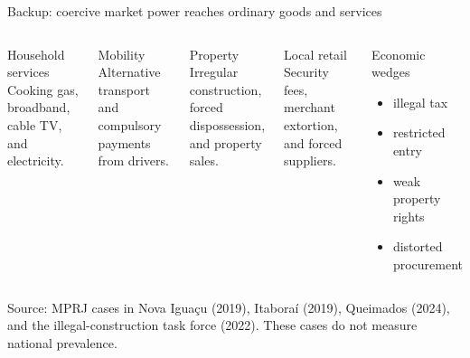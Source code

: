 \documentclass[10pt,aspectratio=169]{beamer}
\newcommand{\source}[1]{%
  \par\vfill{\tiny\color{MidGray}Source: #1}}
\begin{document}
\begin{frame}{Backup: coercive market power reaches ordinary goods and services}
  \begin{columns}[T,onlytextwidth]
      \begin{block}{Household services}
        Cooking gas, broadband, cable TV, and electricity.
      \end{block}
      \begin{block}{Mobility}
        Alternative transport and compulsory payments from drivers.
      \end{block}
      \begin{block}{Property}
        Irregular construction, forced dispossession, and property sales.
      \end{block}
      \begin{block}{Local retail}
        Security fees, merchant extortion, and forced suppliers.
      \end{block}
      \begin{exampleblock}{Economic wedges}
        \begin{itemize}\scriptsize
          \item illegal tax
          \item restricted entry
          \item weak property rights
          \item distorted procurement
        \end{itemize}
      \end{exampleblock}
  \end{columns}
  \source{MPRJ cases in Nova Iguaçu (2019), Itaboraí (2019), Queimados (2024), and the illegal-construction task force (2022). These cases do not measure national prevalence.}
\end{frame}
\end{document}
